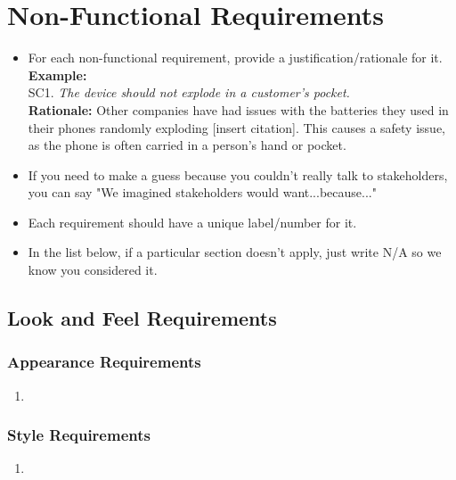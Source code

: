 \documentclass[]{article}
\begin{document}

\section{Non-Functional Requirements}
\label{sec:non-functional_requirements}


\begin{itemize}
	\item For each non-functional requirement, provide a justification/rationale for it.\\
	{\bf Example:} \\
	SC1. \emph{The device should not explode in a customer’s pocket.}\\
	{\bf Rationale:} Other companies have had issues with the batteries they used in their phones randomly exploding [insert citation]. This causes a safety issue, as the phone is often carried in a person's hand or pocket.	
	\item If you need to make a guess because you couldn't really talk to stakeholders, you can say "We imagined stakeholders would want...because..."
	\item Each requirement should have a unique label/number for it.
	\item In the list below, if a particular section doesn't apply, just write N/A so we know you considered it.
\end{itemize}

\subsection{Look and Feel Requirements}
\label{sub:look_and_feel_requirements}

\subsubsection{Appearance Requirements}
\label{ssub:appearance_requirements}
\begin{enumerate}[label={LF-A\arabic*.}]
    \item 
\end{enumerate}

\subsubsection{Style Requirements}
\label{ssub:style_requirements}
\begin{enumerate}[label={LF-S\arabic*.}]
    \item 
\end{enumerate}
\end{document}
